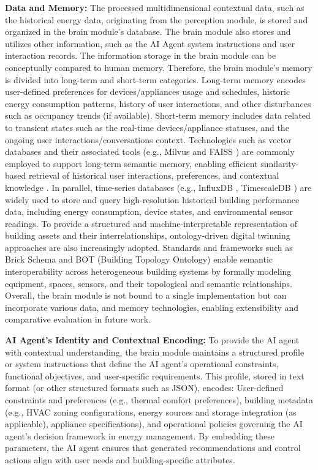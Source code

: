 \documentclass[final,3p,times]{elsarticle}
\begin{document}
\textbf{Data and Memory:} The processed multidimensional contextual data, such as the historical energy data, originating from the perception module, is stored and organized in the brain module's database. The brain module also stores and utilizes other information, such as the AI Agent system instructions and user interaction records. The information storage in the brain module can be conceptually compared to human memory. Therefore, the brain module’s memory is divided into long-term and short-term categories. Long-term memory encodes user-defined preferences for devices/appliances usage and schedules, historic energy consumption patterns, history of user interactions, and other disturbances such as occupancy trends (if available). Short-term memory includes data related to transient states such as the real-time devices/appliance statuses, and the ongoing user interactions/conversations context. Technologies such as vector databases and their associated tools (e.g., Milvus \cite{wang2021milvus} and FAISS \cite{douze2025faiss}) are commonly employed to support long-term semantic memory, enabling efficient similarity-based retrieval of historical user interactions, preferences, and contextual knowledge \cite{lewis2020retrieval}. In parallel, time-series databases (e.g., InfluxDB \cite{naqvi2017time}, TimescaleDB \cite{shah2022performance}) are widely used to store and query high-resolution historical building performance data, including energy consumption, device states, and environmental sensor readings. To provide a structured and machine-interpretable representation of building assets and their interrelationships, ontology-driven digital twinning approaches are also increasingly adopted. Standards and frameworks such as Brick Schema \cite{balaji2016brick} and BOT (Building Topology Ontology) \cite{rasmussen2020bot} enable semantic interoperability across heterogeneous building systems by formally modeling equipment, spaces, sensors, and their topological and semantic relationships. Overall, the brain module is not bound to a single implementation but can incorporate various data, and memory technologies, enabling extensibility and comparative evaluation in future work.


\textbf{AI Agent's Identity and Contextual Encoding:} To provide the AI agent with contextual understanding, the brain module maintains a structured profile or system instructions that define the AI agent’s operational constraints, functional objectives, and user-specific requirements. This profile, stored in text format (or other structured formats such as JSON), encodes: User-defined constraints and preferences (e.g., thermal comfort preferences), building metadata (e.g., HVAC zoning configurations, energy sources and storage integration (as applicable), appliance specifications), and operational policies governing the AI agent’s decision framework in energy management. By embedding these parameters, the AI agent ensures that generated recommendations and control actions align with user needs and building-specific attributes.
\end{document}
